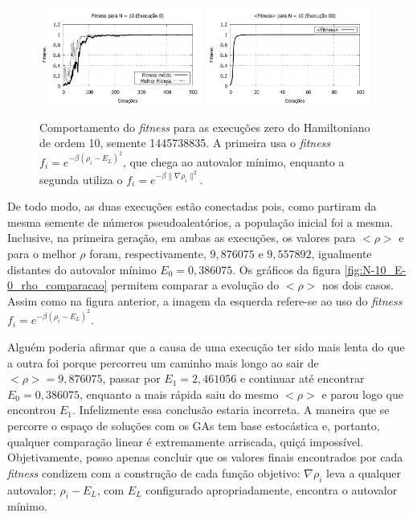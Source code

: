 	\begin{figure}[htbp]
		\centering
			\includegraphics[width=0.48\textwidth]{figs/resultados/fitnessEL/N-10_E-0_fitness.pdf}
			\includegraphics[width=0.48\textwidth]{figs/resultados/fitnessGrad/N10_00_fitness.pdf}
		\caption{Comportamento do \textit{fitness} para as execuções zero do Hamiltoniano de ordem 10, semente 1445738835. A primeira usa o \textit{fitness} $f_i = e^{-\beta(\rho_i - E_L)^2}$, que chega ao autovalor mínimo, enquanto a segunda utiliza o $f_i = e^{-\beta \| \nabla \rho_i \|^2}$.}
		\label{fig:N-10_E-0_fitness}
	\end{figure}
	
	De todo modo, as duas execuções estão conectadas pois, como partiram da mesma semente de números pseudoaleatórios, a população inicial foi a mesma. Inclusive, na primeira geração, em ambas as execuções, os valores para $<\rho>$ e para o melhor $\rho$ foram, respectivamente, $9,876075$ e $9,557892$, igualmente distantes do autovalor mínimo $E_0 = 0,386075$. Os gráficos da figura \ref{fig:N-10_E-0_rho_comparacao} permitem comparar a evolução do $<\rho>$ nos dois casos. Assim como na figura anterior, a imagem da esquerda refere-se ao uso do \textit{fitness} $f_i = e^{-\beta(\rho_i - E_L)^2}$.
	
	Alguém poderia afirmar que a causa de uma execução ter sido mais lenta do que a outra foi porque percorreu um caminho mais longo ao sair de $<\rho> = 9,876075$, passar por $E_1 = 2,461056$ e continuar até encontrar $E_0 = 0,386075$, enquanto a mais rápida saiu do mesmo $<\rho>$ e parou logo que encontrou $E_1$. Infelizmente essa conclusão estaria incorreta. A maneira que se percorre o espaço de soluções com os GAs tem base estocástica e, portanto, qualquer comparação linear é extremamente arriscada, quiçá impossível. Objetivamente, posso apenas concluir que os valores finais encontrados por cada \textit{fitness} condizem com a construção de cada função objetivo: $\nabla \rho_i$ leva a qualquer autovalor; $\rho_i - E_L$, com $E_L$ configurado apropriadamente, encontra o autovalor mínimo.
	
